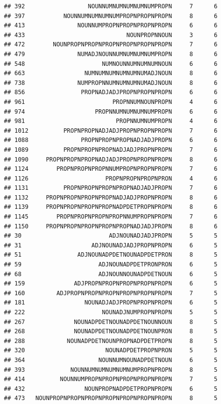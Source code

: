\documentclass[]{article}
\begin{document}
\begin{verbatim}
## 392                  NOUNNUMNUMNUMNUMNUMPROPN     7      6
## 397           NOUNNUMNUMNUMNUMPROPNPROPNPROPN     8      6
## 413               NOUNNUMPROPNPROPNPROPNPROPN     6      6
## 433                             NOUNPROPNNOUN     3      6
## 472        NOUNPROPNPROPNPROPNPROPNPROPNPROPN     7      6
## 479               NUMADJNOUNNUMNUMNUMNUMPROPN     8      6
## 548                      NUMNOUNNUMNUMNUMNOUN     6      6
## 663                 NUMNUMNUMNUMNUMNUMADJNOUN     8      6
## 738               NUMPROPNNUMNUMNUMNUMADJNOUN     8      6
## 856                PROPNADJADJPROPNPROPNPROPN     6      6
## 961                         PROPNNUMNOUNPROPN     4      6
## 974                    PROPNNUMNUMNUMNUMPROPN     6      6
## 981                          PROPNNUMNUMPROPN     4      6
## 1012          PROPNPROPNADJADJPROPNPROPNPROPN     7      6
## 1088               PROPNPROPNPROPNADJADJPROPN     6      6
## 1089          PROPNPROPNPROPNADJADJPROPNPROPN     7      6
## 1090     PROPNPROPNPROPNADJADJPROPNPROPNPROPN     8      6
## 1124        PROPNPROPNPROPNNUMPROPNPROPNPROPN     7      6
## 1126                      PROPNPROPNPROPNPRON     4      6
## 1131          PROPNPROPNPROPNPROPNADJADJPROPN     7      6
## 1132     PROPNPROPNPROPNPROPNADJADJPROPNPROPN     8      6
## 1139     PROPNPROPNPROPNPROPNADPDETPROPNPROPN     8      6
## 1145        PROPNPROPNPROPNPROPNNUMPROPNPROPN     7      6
## 1150     PROPNPROPNPROPNPROPNPROPNADJADJPROPN     8      6
## 30                         ADJNOUNADJADJPROPN     5      5
## 31                    ADJNOUNADJADJPROPNPROPN     6      5
## 51                ADJNOUNADPDETNOUNADPDETPRON     8      5
## 59                      ADJNOUNADPDETPRONPRON     6      5
## 68                      ADJNOUNNOUNADPDETNOUN     6      5
## 159              ADJPROPNPROPNPROPNPROPNPROPN     6      5
## 160         ADJPROPNPROPNPROPNPROPNPROPNPROPN     7      5
## 181                 NOUNADJADJPROPNPROPNPROPN     6      5
## 222                      NOUNADJNUMPROPNPROPN     5      5
## 267              NOUNADPDETNOUNADPDETNOUNNOUN     8      5
## 268              NOUNADPDETNOUNADPDETNOUNPRON     8      5
## 288            NOUNADPDETNOUNPROPNADPDETPROPN     8      5
## 320                       NOUNADPDETPROPNPRON     5      5
## 364                     NOUNNUMNOUNADPDETNOUN     6      5
## 393             NOUNNUMNUMNUMNUMNUMPROPNPROPN     8      5
## 414          NOUNNUMPROPNPROPNPROPNPROPNPROPN     7      5
## 432                 NOUNPROPNADPDETPROPNPROPN     6      5
## 473   NOUNPROPNPROPNPROPNPROPNPROPNPROPNPROPN     8      5

\end{verbatim}
\end{document}
